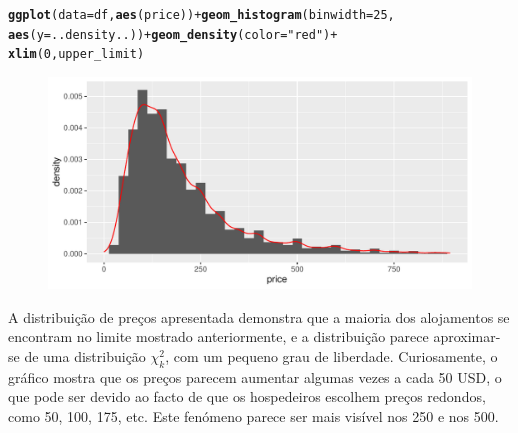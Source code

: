 \documentclass[justified, 11pt]{scrartcl}\usepackage[]{graphicx}\usepackage[]{xcolor}
\makeatletter
\def\maxwidth{ %
  \ifdim\Gin@nat@width>\linewidth
    \linewidth
  \else
    \Gin@nat@width
  \fi
}
\newcommand{\hlnum}[1]{\textcolor[rgb]{0.686,0.059,0.569}{#1}}%
\newcommand{\hlstr}[1]{\textcolor[rgb]{0.192,0.494,0.8}{#1}}%
\newcommand{\hlopt}[1]{\textcolor[rgb]{0,0,0}{#1}}%
\newcommand{\hlstd}[1]{\textcolor[rgb]{0.345,0.345,0.345}{#1}}%
\newcommand{\hlkwc}[1]{\textcolor[rgb]{0.333,0.667,0.333}{#1}}%
\newcommand{\hlkwd}[1]{\textcolor[rgb]{0.737,0.353,0.396}{\textbf{#1}}}%
\newenvironment{kframe}{%
 \def\at@end@of@kframe{}%
 \ifinner\ifhmode%
  \def\at@end@of@kframe{\end{minipage}}%
  \begin{minipage}{\columnwidth}%
 \fi\fi%
 \def\FrameCommand##1{\hskip\@totalleftmargin \hskip-\fboxsep
 \colorbox{shadecolor}{##1}\hskip-\fboxsep
     \hskip-\linewidth \hskip-\@totalleftmargin \hskip\columnwidth}%
 \MakeFramed {\advance\hsize-\width
   \@totalleftmargin\z@ \linewidth\hsize
   \@setminipage}}%
 {\par\unskip\endMakeFramed%
 \at@end@of@kframe}
\newenvironment{knitrout}{}{} %
\makeatother
\begin{document}
\begin{knitrout}
\color{fgcolor}\begin{kframe}
\begin{alltt}
\hlkwd{ggplot}\hlstd{(}\hlkwc{data} \hlstd{= df,} \hlkwd{aes}\hlstd{(price))} \hlopt{+} \hlkwd{geom_histogram}\hlstd{(}\hlkwc{binwidth} \hlstd{=} \hlnum{25}\hlstd{,}
  \hlkwd{aes}\hlstd{(}\hlkwc{y} \hlstd{= ..density..))} \hlopt{+} \hlkwd{geom_density}\hlstd{(}\hlkwc{color} \hlstd{=} \hlstr{"red"}\hlstd{)} \hlopt{+}
  \hlkwd{xlim}\hlstd{(}\hlnum{0}\hlstd{, upper_limit)}
\end{alltt}
\end{kframe}\begin{figure}
\includegraphics[width=\maxwidth]{figure/chunk-priceHist-1} \end{figure}

\end{knitrout}
A distribuição de preços apresentada demonstra que a maioria dos alojamentos se encontram no limite mostrado anteriormente, e a distribuição parece aproximar-se de uma distribuição $\chi_{k}^{2}$, com um pequeno grau de liberdade. Curiosamente, o gráfico mostra que os preços parecem aumentar algumas vezes a cada 50 USD, o que pode ser devido ao facto de que os hospedeiros escolhem preços redondos, como 50, 100, 175, etc. Este fenómeno parece ser mais visível nos 250 e nos 500.\\
\end{document}
